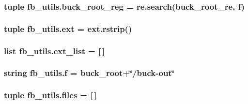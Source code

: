 \hypertarget{namespacefb__utils_acb42658c320fc5500109225f2150f3a5}{
\subsubsection[{buck\-\_\-root\-\_\-reg}]{\setlength{\rightskip}{0pt plus 5cm}tuple fb\-\_\-utils.\-buck\-\_\-root\-\_\-reg = re.\-search({\bf buck\-\_\-root\-\_\-re}, {\bf f})}}\label{namespacefb__utils_acb42658c320fc5500109225f2150f3a5}
\hypertarget{namespacefb__utils_a4a9b92731ce5163b4c224b682d51686a}{
\subsubsection[{ext}]{\setlength{\rightskip}{0pt plus 5cm}tuple fb\-\_\-utils.\-ext = ext.\-rstrip()}}\label{namespacefb__utils_a4a9b92731ce5163b4c224b682d51686a}
\hypertarget{namespacefb__utils_a3bb6a33cce451d2aa6cd555cbf3f81c9}{
\subsubsection[{ext\-\_\-list}]{\setlength{\rightskip}{0pt plus 5cm}list fb\-\_\-utils.\-ext\-\_\-list = \mbox{[}$\,$\mbox{]}}}\label{namespacefb__utils_a3bb6a33cce451d2aa6cd555cbf3f81c9}
\hypertarget{namespacefb__utils_a1fd881f8821084c45c3ee6f19c7d4733}{
\subsubsection[{f}]{\setlength{\rightskip}{0pt plus 5cm}string fb\-\_\-utils.\-f = {\bf buck\-\_\-root}+\char`\"{}/buck-\/out\char`\"{}}}\label{namespacefb__utils_a1fd881f8821084c45c3ee6f19c7d4733}
\hypertarget{namespacefb__utils_ada75fccb2ac0a4b4a48c90bdf0821fd2}{
\subsubsection[{files}]{\setlength{\rightskip}{0pt plus 5cm}tuple fb\-\_\-utils.\-files = \mbox{[}$\,$\mbox{]}}}\label{namespacefb__utils_ada75fccb2ac0a4b4a48c90bdf0821fd2}
